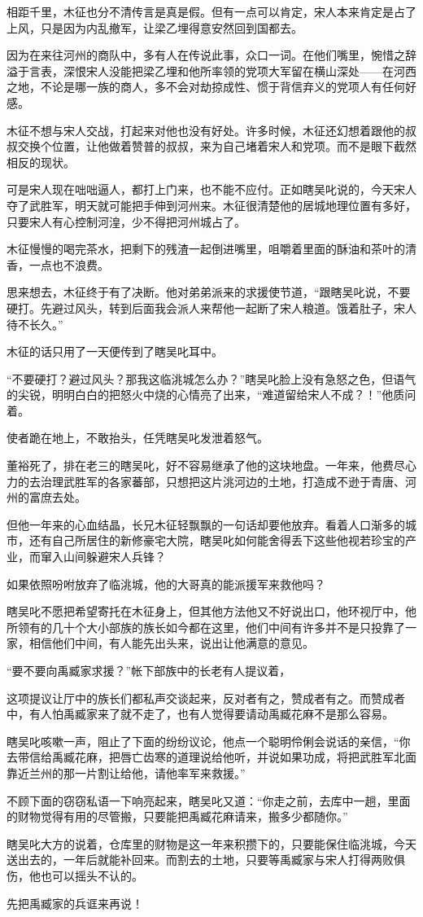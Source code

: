相距千里，木征也分不清传言是真是假。但有一点可以肯定，宋人本来肯定是占了上风，只是因为内乱撤军，让梁乙埋得意安然回到国都去。

因为在来往河州的商队中，多有人在传说此事，众口一词。在他们嘴里，惋惜之辞溢于言表，深恨宋人没能把梁乙埋和他所率领的党项大军留在横山深处——在河西之地，不论是哪一族的商人，多不会对劫掠成性、惯于背信弃义的党项人有任何好感。

木征不想与宋人交战，打起来对他也没有好处。许多时候，木征还幻想着跟他的叔叔交换个位置，让他做着赞普的叔叔，来为自己堵着宋人和党项。而不是眼下截然相反的现状。

可是宋人现在咄咄逼人，都打上门来，也不能不应付。正如瞎吴叱说的，今天宋人夺了武胜军，明天就可能把手伸到河州来。木征很清楚他的居城地理位置有多好，只要宋人有心控制河湟，少不得把河州城占了。

木征慢慢的喝完茶水，把剩下的残渣一起倒进嘴里，咀嚼着里面的酥油和茶叶的清香，一点也不浪费。

思来想去，木征终于有了决断。他对弟弟派来的求援使节道，“跟瞎吴叱说，不要硬打。先避过风头，转到后面我会派人来帮他一起断了宋人粮道。饿着肚子，宋人待不长久。”

木征的话只用了一天便传到了瞎吴叱耳中。

“不要硬打？避过风头？那我这临洮城怎么办？”瞎吴叱脸上没有急怒之色，但语气的尖锐，明明白白的把怒火中烧的心情亮了出来，“难道留给宋人不成？！”他质问着。

使者跪在地上，不敢抬头，任凭瞎吴叱发泄着怒气。

董裕死了，排在老三的瞎吴叱，好不容易继承了他的这块地盘。一年来，他费尽心力的去治理武胜军的各家蕃部，只想把这片洮河边的土地，打造成不逊于青唐、河州的富庶去处。

但他一年来的心血结晶，长兄木征轻飘飘的一句话却要他放弃。看着人口渐多的城市，还有自己所居住的新修豪宅大院，瞎吴叱如何能舍得丢下这些他视若珍宝的产业，而窜入山间躲避宋人兵锋？

如果依照吩咐放弃了临洮城，他的大哥真的能派援军来救他吗？

瞎吴叱不愿把希望寄托在木征身上，但其他方法他又不好说出口，他环视厅中，他所领有的几十个大小部族的族长如今都在这里，他们中间有许多并不是只投靠了一家，相信他们中间，有人能先出头来，说出让他满意的意见。

“要不要向禹臧家求援？”帐下部族中的长老有人提议着，

这项提议让厅中的族长们都私声交谈起来，反对者有之，赞成者有之。而赞成者中，有人怕禹臧家来了就不走了，也有人觉得要请动禹臧花麻不是那么容易。

瞎吴叱咳嗽一声，阻止了下面的纷纷议论，他点一个聪明伶俐会说话的亲信，“你去带信给禹臧花麻，把唇亡齿寒的道理说给他听，并说如果功成，将把武胜军北面靠近兰州的那一片割让给他，请他率军来救援。”

不顾下面的窃窃私语一下响亮起来，瞎吴叱又道：“你走之前，去库中一趟，里面的财物觉得有用的尽管搬，只要能把禹臧花麻请来，搬多少都随你。”

瞎吴叱大方的说着，仓库里的财物是这一年来积攒下的，只要能保住临洮城，今天送出去的，一年后就能补回来。而割去的土地，只要等禹臧家与宋人打得两败俱伤，他也可以摇头不认的。

先把禹臧家的兵诓来再说！

